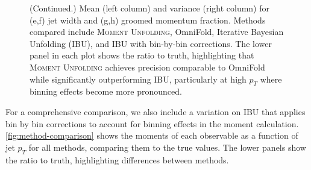 \begin{figure}
    
    \caption[]{(Continued.) Mean (left column) and variance (right column) for (e,f) jet width and (g,h) groomed momentum fraction. Methods compared include \textsc{Moment Unfolding}, OmniFold, Iterative Bayesian Unfolding (IBU), and IBU with bin-by-bin corrections. The lower panel in each plot shows the ratio to truth, highlighting that \textsc{Moment Unfolding} achieves precision comparable to OmniFold while significantly outperforming IBU, particularly at high $p_T$ where binning effects become more pronounced.}
\end{figure}

    For a comprehensive comparison, we also include a variation on IBU that applies bin by bin corrections to account for binning effects in the moment calculation.
    \cref{fig:method-comparison} shows the moments of each observable as a function of jet $p_T$ for all methods, comparing them to the true values.
    The lower panels show the ratio to truth, highlighting differences between methods.

